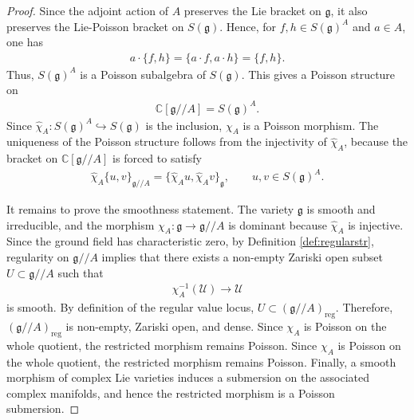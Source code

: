 \documentclass[11pt,reqno]{amsart}
\newtheorem*{theorem A}{Main Theorem A}
\newtheorem*{theorem B}{Main Theorem B}
\newtheorem*{theorem C}{Main Theorem C}
\newtheorem*{theorem D}{Main Theorem D}
\theoremstyle{definition}
\theoremstyle{plain}
\theoremstyle{conclusion}
\begin{document}
\begin{proof}
Since the adjoint action of $A$ preserves the Lie bracket on $\mathfrak{g}$, it also preserves the Lie-Poisson bracket on $S(\mathfrak{g})$. Hence, for $f,h\in S(\mathfrak{g})^A$ and $a\in A$, one has \begin{align*} 
a\cdot\{f,h\}=\{a\cdot f,a\cdot h\}=\{f,h\}.
\end{align*} Thus, $S(\mathfrak{g})^A$ is a Poisson subalgebra of $S(\mathfrak{g})$. This gives a Poisson structure on \begin{align*}
\mathbb{C} [\mathfrak{g}//A] = S(\mathfrak{g})^A. 
\end{align*} Since $\widehat{\chi}_A:S(\mathfrak{g})^A \hookrightarrow S(\mathfrak{g})$ is the inclusion, $\chi_A$ is a Poisson morphism. The uniqueness of the Poisson structure follows from the injectivity of $\widehat{\chi}_A$, because the bracket on $\mathbb{C} [\mathfrak{g}//A]$ is forced to satisfy
\begin{align*} \widehat{\chi}_A\{u,v\}_{\mathfrak{g}//A}=\{\widehat{\chi}_Au,\widehat{\chi}_Av\}_{\mathfrak{g}},\qquad u,v\in S(\mathfrak{g})^A. \end{align*}

It remains to prove the smoothness statement. The variety $\mathfrak{g}$ is smooth and irreducible, and the morphism $\chi_A:\mathfrak{g}\to\mathfrak{g}//A$ is dominant because $\widehat{\chi}_A$ is injective. Since the ground field has characteristic zero, by Definition \ref{def:regularstr}, regularity on $\mathfrak{g}//A$ implies that there exists a non-empty Zariski open subset $U\subset\mathfrak{g}//A$ such that
\begin{align*} \chi_A^{-1}(\mathcal{U})\longrightarrow \mathcal{U} \end{align*}
is smooth. By definition of the regular value locus, $U\subset(\mathfrak{g}//A)_{\mathrm{reg}}$. Therefore, $(\mathfrak{g}//A)_{\mathrm{reg}}$ is non-empty, Zariski open, and dense. Since $\chi_A$ is Poisson on the whole quotient, the restricted morphism remains Poisson. Since $\chi_A$ is Poisson on the whole quotient, the restricted morphism remains Poisson. Finally, a smooth morphism of complex Lie varieties induces a submersion on the associated complex manifolds, and hence the restricted morphism is a Poisson submersion.
\end{proof}
\end{document}
